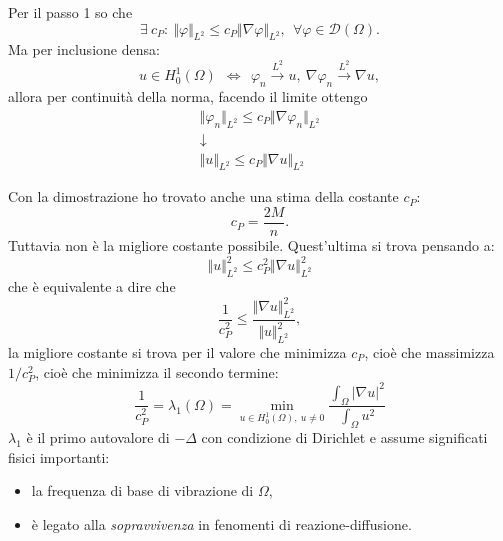 \documentclass[10pt,a4paper,twoside,openright]{book}
\begin{document}
\begin{dimostrazione}
	Per il passo 1 so che 
	\begin{equation*}
		\exists \ c_{P} :\ \Vert \varphi \Vert _{L^{2}} \leqslant c_{P}\Vert \nabla \varphi \Vert _{L^{2}} ,\ \ \forall \varphi \in \mathcal{D}( \Omega ) .
	\end{equation*}
	Ma per inclusione densa:
	\begin{equation*}
		u\in H_{0}^{1}( \Omega ) \ \ \Leftrightarrow \ \ \varphi _{n}\xrightarrow{L^{2}} u,\ \nabla \varphi _{n}\xrightarrow{L^{2}} \nabla u,
	\end{equation*}
	allora per continuità della norma, facendo il limite ottengo
	\begin{gather*}
		\Vert \varphi _{n}\Vert _{L^{2}} \leqslant c_{P}\Vert \nabla \varphi _{n}\Vert _{L^{2}}\\
		\downarrow \\
		\Vert u\Vert _{L^{2}} \leqslant c_{P}\Vert \nabla u\Vert _{L^{2}}
	\end{gather*}
\end{dimostrazione}
\begin{oss}
	Con la dimostrazione ho trovato anche una stima della costante $\displaystyle c_{P}$:
	\begin{equation*}
		c_{P} =\frac{2M}{n} .
	\end{equation*}
	Tuttavia non è la migliore costante possibile. Quest'ultima si trova pensando a:
	\begin{equation*}
		\Vert u\Vert _{L^{2}}^{2} \leqslant c_{P}^{2}\Vert \nabla u\Vert _{L^{2}}^{2}
	\end{equation*}
	che è equivalente a dire che
	\begin{equation*}
		\frac{1}{c_{P}^{2}} \leqslant \frac{\Vert \nabla u\Vert _{L^{2}}^{2}}{\Vert u\Vert _{L^{2}}^{2}} ,
	\end{equation*}
	la migliore costante si trova per il valore che minimizza $\displaystyle c_{P}$, cioè che massimizza $\displaystyle 1/c_{P}^{2}$, cioè che minimizza il secondo termine:
	\begin{equation}
		\frac{1}{c_{P}^{2}} =\lambda _{1}( \Omega ) =\min_{u\in H_{0}^{1}( \Omega ) ,\ u\neq 0}\frac{\int _{\Omega }| \nabla u| ^{2}}{\int _{\Omega } u^{2}}
	\end{equation}
	$\displaystyle \lambda _{1}$ è il primo autovalore di $\displaystyle -\Delta $ con condizione di Dirichlet e assume significati fisici importanti:
	\begin{itemize}
		\item la frequenza di base di vibrazione di $\displaystyle \Omega $,
		\item è legato alla \textit{sopravvivenza} in fenomenti di reazione-diffusione.
	\end{itemize}
\end{oss}
\end{document}

